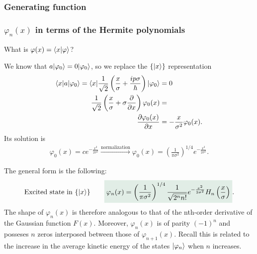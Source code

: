 \subsubsection{Generating function}

%
\subsubsection{$\varphi_n(x)$ in terms of the Hermite polynomials}
What is $\varphi(x)=\langle x|\varphi\rangle$?

We know that $a|\varphi_0\rangle=0|\varphi_0\rangle$, so we replace the $\{|x\rangle\}$ representation 
\begin{align*}
    \langle x|a|\varphi_0\rangle=\langle x|\frac{1}{\sqrt{2}}\left(\frac{x}{\sigma}+\frac{ip\sigma}{\hbar}\right)|\varphi_0\rangle&=0\\
    \frac{1}{\sqrt{2}}\left(\frac{x}{\sigma}+\sigma\frac{\partial}{\partial x}\right)\varphi_0(x)&=\\
    \frac{\partial\varphi_0(x)}{\partial x}&=-\frac{x}{\sigma^2}\varphi_0(x).
\end{align*}
Its solution is 
\begin{align*}
    \varphi_0(x)=ce^{-\frac{x^2}{2\sigma^2}}\stackrel{\text{normalization}}{\longrightarrow}\varphi_0(x)=\left(\frac{1}{\pi\sigma^2}\right)^{1/4}e^{-\frac{x^2}{2\sigma^2}}.
\end{align*}

The general form is the following:
\begin{align}
    \text{Excited state in $\{\ket{x}\}$}\qquad\highlight{\varphi_n(x)=
    \left(\frac{1}{\pi\sigma^2}\right)^{1/4}\frac{1}{\sqrt{2^nn!}}e^{-\frac{x^2}{2\sigma^2}}H_n\left(\frac{x}{\sigma}\right)}.
\end{align}
The shape of $\varphi_n(x)$ is therefore analogous to that of the nth-order derivative of the Gaussian function $F(x)$. Moreover, $\varphi_n(x)$ is of parity 
$(-1)^n$ and posseses $n$ zeros interposed between those of $\varphi_{n+1}(x)$. Recall this is related to the increase in the average kinetic energy of the 
states $|\varphi_n\rangle$ when $n$ increases.
%
